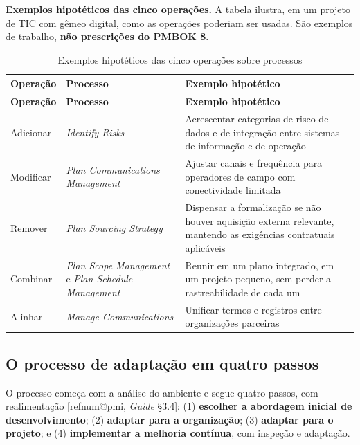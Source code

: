 \documentclass[12pt,a4paper,article,oneside,english,brazil]{abntex2}
\makeatletter
\newcommand{\fontetab}[1]{\par\vspace{3pt}{\small\noindent Fonte: #1\par}}
\newcommand{\refnum}[1]{\csname refnum@#1\endcsname}
\makeatother
\begin{document}
\textbf{Exemplos hipotéticos das cinco operações.} A tabela ilustra, em um projeto de TIC com gêmeo digital, como as operações poderiam ser usadas. São exemplos de trabalho, \textbf{não prescrições do PMBOK 8}.

\begingroup\SingleSpacing\small
\begin{longtable}{@{}>{\raggedright\arraybackslash}p{}>{\raggedright\arraybackslash}p{}>{\raggedright\arraybackslash}p{}@{}}
\caption{Exemplos hipotéticos das cinco operações sobre processos}\label{tab:t10}\\
\hline
\textbf{Operação} & \textbf{Processo} & \textbf{Exemplo hipotético}\\
\hline
\endfirsthead
\hline
\textbf{Operação} & \textbf{Processo} & \textbf{Exemplo hipotético}\\
\hline
\endhead
\hline
\endfoot
\hline
\endlastfoot
Adicionar & \textit{Identify Risks} & Acrescentar categorias de risco de dados e de integração entre sistemas de informação e de operação\\[3pt]
Modificar & \textit{Plan Communications Management} & Ajustar canais e frequência para operadores de campo com conectividade limitada\\[3pt]
Remover & \textit{Plan Sourcing Strategy} & Dispensar a formalização se não houver aquisição externa relevante, mantendo as exigências contratuais aplicáveis\\[3pt]
Combinar & \textit{Plan Scope Management} e \textit{Plan Schedule Management} & Reunir em um plano integrado, em um projeto pequeno, sem perder a rastreabilidade de cada um\\[3pt]
Alinhar & \textit{Manage Communications} & Unificar termos e registros entre organizações parceiras\\[3pt]
\end{longtable}
\endgroup
\fontetab{Elaborado pelos autores (2026); exemplos ilustrativos, não prescrições do PMBOK 8.}
\subsection{O processo de adaptação em quatro passos}

O processo começa com a análise do ambiente e segue quatro passos, com realimentação [\refnum{pmi}, \textit{Guide} §3.4]: (1) \textbf{escolher a abordagem inicial de desenvolvimento}; (2) \textbf{adaptar para a organização}; (3) \textbf{adaptar para o projeto}; e (4) \textbf{implementar a melhoria contínua}, com inspeção e adaptação.
\end{document}
